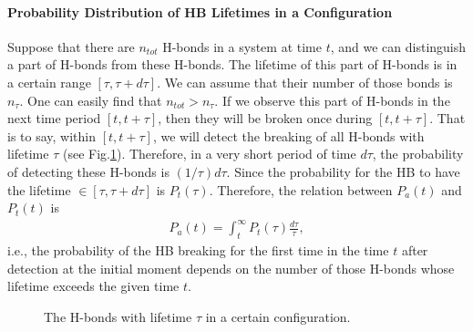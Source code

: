 {\paragraph{Probability Distribution of HB Lifetimes in a Configuration}
Suppose that there are $n_{tot}$ H-bonds in a system at time $t$, and we can distinguish a part of H-bonds from these H-bonds. 
The lifetime of this part of H-bonds is in a certain range $[\tau, \tau + d\tau]$. We can assume that their number of those bonds is $n_\tau$. 
One can easily find that $n_{tot}>n_\tau$. If we observe this part of H-bonds in the next time period $[t, t+\tau]$, 
then they will be broken once during $[t, t+\tau]$. 
That is to say, within $[t,t+\tau]$, we will detect the breaking of all H-bonds with lifetime $\tau$ (see Fig.\thinspace\ref{fig:P_tc}).  
Therefore, in a very short period of time $d\tau$, the probability of detecting these H-bonds is $(1/\tau)d\tau$.
Since the probability for the HB to have the lifetime $\in [\tau,\tau+d\tau]$ is $P_t(\tau)$. 
Therefore, the relation between $P_a(t)$ and $P_t(t)$ is
\begin{eqnarray}
P_a(t) = \int_t^\infty P_t(\tau)\frac{d\tau}{\tau},
\label{eq:Pt_and_P}
\end{eqnarray}
i.e., the probability of the HB breaking for the first time in the time $t$ after detection at the initial moment depends on 
the number of those H-bonds whose lifetime exceeds the given time $t$. \cite{Voloshin2009}
\begin{figure}
\centering
{}
  \caption{\label{fig:P_tc} The H-bonds with lifetime $\tau$ in a certain configuration. 
}
\end{figure}}

